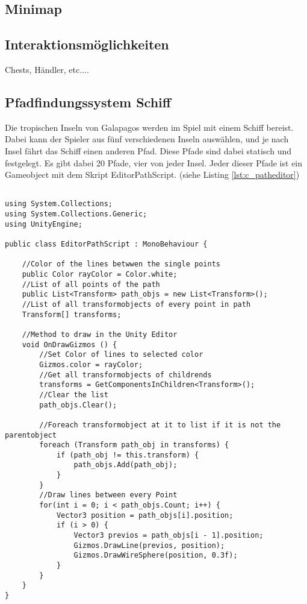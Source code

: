\subsection{Minimap}



\subsection{Interaktionsmöglichkeiten}
Chests, Händler, etc....


\subsection{Pfadfindungssystem Schiff}
Die tropischen Inseln von Galapagos werden im Spiel mit einem Schiff bereist. Dabei kann der Spieler aus fünf verschiedenen Inseln auswählen, und je nach Insel fährt das Schiff einen anderen Pfad. Diese Pfade sind dabei statisch und festgelegt. Es gibt dabei 20 Pfade, vier von jeder Insel. Jeder dieser Pfade ist ein Gameobject mit dem Skript EditorPathScript. (siehe Listing \ref{lst:c_patheditor})

\begin{scriptsize}
\lstset{
	float,
	caption=Skript EditorPathScript.cs, 
	language=[Sharp]C, 
	frame=single,  
	showstringspaces=false, 
	showspaces=false, 
	numbers=left, 
	captionpos=b, 
	belowcaptionskip=4pt,
	basicstyle=\ttfamily
} 
\newpage
\begin{lstlisting}[label=lst:c_patheditor]

using System.Collections;
using System.Collections.Generic;
using UnityEngine;

public class EditorPathScript : MonoBehaviour {

    //Color of the lines betwwen the single points
    public Color rayColor = Color.white;
    //List of all points of the path
    public List<Transform> path_objs = new List<Transform>();
    //List of all transformobjects of every point in path
    Transform[] transforms;

    //Method to draw in the Unity Editor
    void OnDrawGizmos () {
        //Set Color of lines to selected color
        Gizmos.color = rayColor;
        //Get all transformobjects of childrends
        transforms = GetComponentsInChildren<Transform>();
        //Clear the list
        path_objs.Clear();

        //Foreach transformobject at it to list if it is not the parentobject
        foreach (Transform path_obj in transforms) {
            if (path_obj != this.transform) {
                path_objs.Add(path_obj);
            }
        }
        //Draw lines between every Point
        for(int i = 0; i < path_objs.Count; i++) {
            Vector3 position = path_objs[i].position;
            if (i > 0) {
                Vector3 previos = path_objs[i - 1].position;
                Gizmos.DrawLine(previos, position);
                Gizmos.DrawWireSphere(position, 0.3f);
            }
        }
    }
}

\end{lstlisting}
\end{scriptsize}

